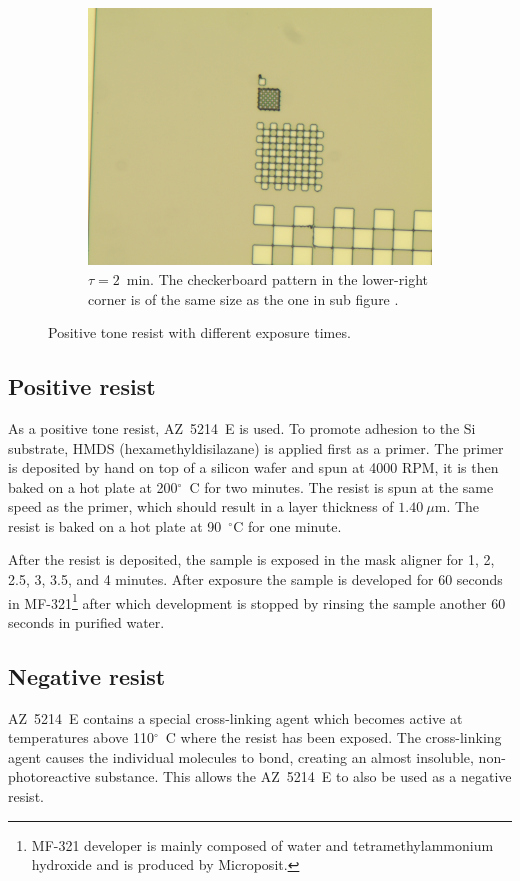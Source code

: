 \begin{figure}[!b]
\begin{subfigure}[t]{0.3\linewidth}
        \centering
        \includegraphics[width=\textwidth]{data/b3a1.jpg}
        \caption{$\tau = 2$~min. The checkerboard pattern in the lower-right corner is of the same size as the one in sub figure .}
        \label{fig:b3a1}
    \end{subfigure}
    \caption{Positive tone resist with different exposure times.}
\end{figure}

\subsection*{Positive resist}
As a positive tone resist, AZ~5214~E is used. To promote adhesion to the Si substrate, HMDS (hexamethyldisilazane) is applied first as a primer. The primer is deposited by hand on top of a silicon wafer and spun at 4000 RPM, it is then baked on a hot plate at 200$^{\circ}$~C for two minutes. The resist is spun at the same speed as the primer, which should result in a layer thickness of $1.40~\mu$m. The resist is baked on a hot plate at 90~$^{\circ}$C for one minute.

After the resist is deposited, the sample is exposed in the mask aligner for 1, 2, 2.5, 3, 3.5, and 4 minutes. After exposure the sample is developed for 60 seconds in MF-321\footnote{MF-321 developer is mainly composed of water and tetramethylammonium hydroxide and is produced by Microposit.} after which development is stopped by rinsing the sample another 60 seconds in purified water.

\subsection*{Negative resist}
AZ~5214~E contains a special cross-linking agent which becomes active at temperatures above 110$^{\circ}$~C where the resist has been exposed. The cross-linking agent causes the individual molecules to bond, creating an almost insoluble, non-photoreactive substance. This allows the AZ~5214~E to also be used as a negative resist.

